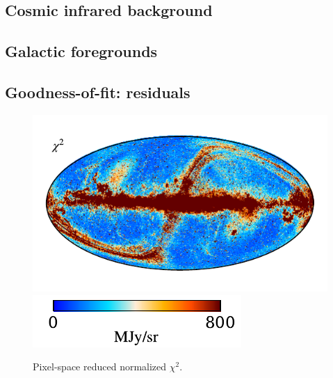 \documentclass{aa}
\begin{document}
\subsection{Cosmic infrared background}
\subsection{Galactic foregrounds}
\subsection{Goodness-of-fit: residuals}

\begin{figure}
	\centering
	\includegraphics{figs/chisq_c0001_000019.pdf}
	\includegraphics{figs/chisq_cbar_c0001_000019.pdf}
	\caption{Pixel-space reduced normalized $\chi^2$.}
	\label{fig:chisq}
\end{figure}
\end{document}

